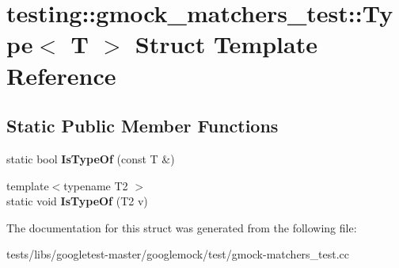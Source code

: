 \hypertarget{structtesting_1_1gmock__matchers__test_1_1Type}{}\section{testing\+:\+:gmock\+\_\+matchers\+\_\+test\+:\+:Type$<$ T $>$ Struct Template Reference}
\label{structtesting_1_1gmock__matchers__test_1_1Type}
\subsection*{Static Public Member Functions}
\begin{DoxyCompactItemize}
\item 
\mbox{\label{structtesting_1_1gmock__matchers__test_1_1Type_ad0b8d166a185471db49aa9009520d74f}} 
static bool {\bfseries Is\+Type\+Of} (const T \&)
\item 
\mbox{\label{structtesting_1_1gmock__matchers__test_1_1Type_a5451b10be4ff47bd2dc3741eb70dde59}} 
{\footnotesize template$<$typename T2 $>$ }\\static void {\bfseries Is\+Type\+Of} (T2 v)
\end{DoxyCompactItemize}


The documentation for this struct was generated from the following file\+:\begin{DoxyCompactItemize}
\item 
tests/libs/googletest-\/master/googlemock/test/gmock-\/matchers\+\_\+test.\+cc\end{DoxyCompactItemize}
